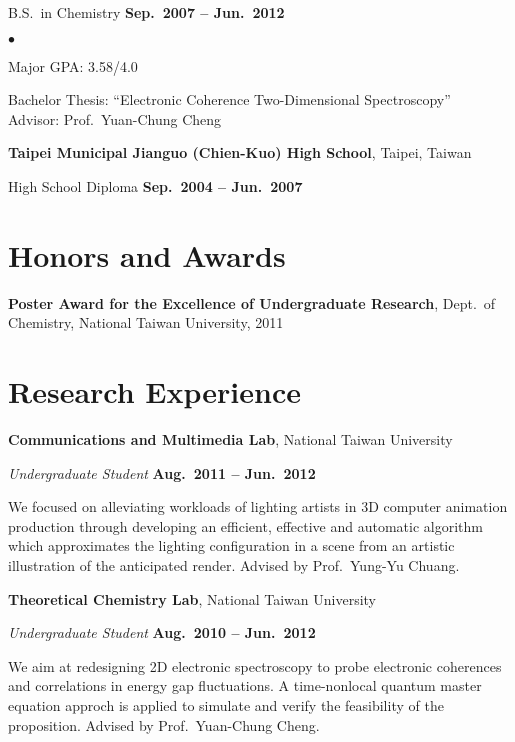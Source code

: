 \documentclass[margin,line, 11pt, a4paper]{res}
\newenvironment{list1}{
  \begin{list}{}{%
      \setlength{\itemsep}{.1in}
      \setlength{\parsep}{0in} \setlength{\parskip}{0in}
      \setlength{\topsep}{.07in} \setlength{\partopsep}{0in} 
      \setlength{\leftmargin}{0.17in}}}{\end{list}}
\newenvironment{list2}{
  \begin{list}{$\bullet$}{%
      \setlength{\itemsep}{.02in}
      \setlength{\parsep}{0in} \setlength{\parskip}{0in}
      \setlength{\topsep}{.05in} \setlength{\partopsep}{0in} 
      \setlength{\leftmargin}{0.2in}}}{\end{list}}
\begin{document}
\begin{resume}
\begin{list1}
\item B.S.~in Chemistry \hfill {\bf Sep.~2007 -- Jun.~2012}

\begin{list2}
{\small \item Major GPA: 3.58/4.0
\item Bachelor Thesis: ``Electronic Coherence Two-Dimensional Spectroscopy''\\Advisor: Prof.~Yuan-Chung Cheng}
\end{list2}
\end{list1}
{\bf Taipei Municipal Jianguo (Chien-Kuo) High School}, Taipei, Taiwan
\begin{list1}
\item High School Diploma \hfill {\bf Sep.~2004 -- Jun.~2007}
\end{list1}

\section{\sc Honors and Awards} 
{\bf Poster Award for the Excellence of Undergraduate Research}, Dept.~of Chemistry, National Taiwan University, 2011

\section{\sc Research Experience}

{\bf Communications and Multimedia Lab}, National Taiwan University

\item{\em Undergraduate Student} \hfill {\bf Aug.~2011 -- Jun.~2012}

{\small We focused on alleviating workloads of lighting artists in 3D computer animation production through developing an efficient, effective and automatic algorithm which approximates the lighting configuration in a scene from an artistic illustration of the anticipated render. Advised by Prof.~Yung-Yu Chuang.}

\vspace{.1in}
{\bf Theoretical Chemistry Lab}, National Taiwan University

\item {\em Undergraduate Student} \hfill {\bf Aug.~2010 -- Jun.~2012}

{\small We aim at redesigning 2D electronic spectroscopy to probe electronic coherences and correlations in energy gap fluctuations. A time-nonlocal quantum master equation approch is applied to simulate and verify the feasibility of the proposition. Advised by Prof.~Yuan-Chung Cheng.}


\end{resume}
\end{document}
